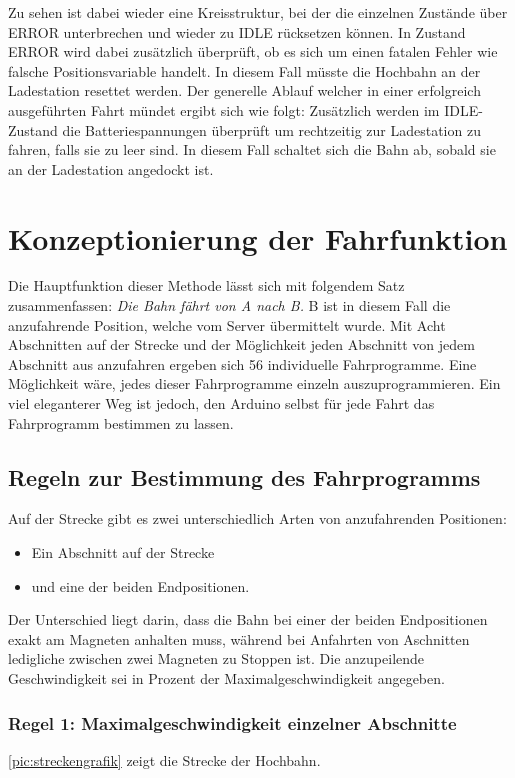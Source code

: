 Zu sehen ist dabei wieder eine Kreisstruktur, bei der die einzelnen Zustände über ERROR unterbrechen und wieder zu IDLE rücksetzen können. In Zustand ERROR wird dabei zusätzlich überprüft, ob es sich um einen fatalen Fehler wie falsche Positionsvariable handelt. In diesem Fall müsste die Hochbahn an der Ladestation resettet werden. Der generelle Ablauf welcher in einer erfolgreich ausgeführten Fahrt mündet ergibt sich wie folgt:
Zusätzlich werden im IDLE-Zustand die Batteriespannungen überprüft um rechtzeitig zur Ladestation zu fahren, falls sie zu leer sind. In diesem Fall schaltet sich die Bahn ab, sobald sie an der Ladestation angedockt ist. 

\section{Konzeptionierung der Fahrfunktion}
Die Hauptfunktion dieser Methode lässt sich mit folgendem Satz zusammenfassen: \textit{Die Bahn fährt von A nach B.} B ist in diesem Fall die anzufahrende Position, welche vom Server übermittelt wurde. Mit Acht Abschnitten auf der Strecke und der Möglichkeit jeden Abschnitt von jedem Abschnitt aus anzufahren ergeben sich 56 individuelle Fahrprogramme. Eine Möglichkeit wäre, jedes dieser Fahrprogramme einzeln auszuprogrammieren. Ein viel eleganterer Weg ist jedoch, den Arduino selbst für jede Fahrt das Fahrprogramm bestimmen zu lassen. 

\subsection{Regeln zur Bestimmung des Fahrprogramms}
Auf der Strecke gibt es zwei unterschiedlich Arten von anzufahrenden Positionen:
\begin{center}
	\begin{itemize}
		\item Ein Abschnitt auf der Strecke
		\item und eine der beiden Endpositionen.
	\end{itemize}
\end{center}
Der Unterschied liegt darin, dass die Bahn bei einer der beiden Endpositionen exakt am Magneten anhalten muss, während bei Anfahrten von Aschnitten ledigliche zwischen zwei Magneten zu Stoppen ist. Die anzupeilende Geschwindigkeit sei in Prozent der Maximalgeschwindigkeit angegeben.
\newpage 
\subsubsection{Regel 1: Maximalgeschwindigkeit einzelner Abschnitte}
\autoref{pic:streckengrafik} zeigt die Strecke der Hochbahn.

